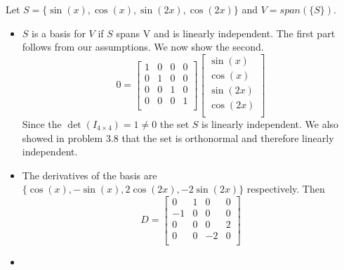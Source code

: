 \documentclass[12pt]{article}
\newenvironment{problem}[2][Problem]{\begin{trivlist}
\item[\hskip \labelsep {\bfseries #1}\hskip \labelsep {\bfseries #2}]}{\end{trivlist}}
\begin{document}
\begin{problem}{8.} Let $S = \{\sin(x), \cos(x), \sin(2x), \cos(2x) \}$ and $V = span(\{S\})$. 
\begin{itemize}
\item [(i)] $S$ is a basis for $V$ if $S$ spans V and is linearly independent. The first part follows from our assumptions. We now show the second. 
\[0 =
  \left[ {\begin{array}{cccc}
   1 & 0 & 0 & 0\\
   0 & 1 & 0 & 0\\
   0 & 0 & 1 & 0\\
   0 & 0 & 0 & 1\\
  \end{array} } \right]\begin{bmatrix}
   \sin(x) \\
   \cos(x) \\
   \sin(2x) \\
   \cos(2x)\\
  \end{bmatrix} 
\]
Since the $\det(I_{4 \times 4}) = 1 \neq 0$ the set $S$ is linearly independent. We also showed in problem 3.8 that the set is orthonormal and therefore linearly independent. 
\item [(ii)] The derivatives of the basis are $\{\cos(x), -\sin(x), 2\cos(2x), -2\sin(2x)\}$ respectively. Then \[D=
  \left[ {\begin{array}{cccc}
   0 & 1 & 0 & 0\\
   -1 & 0 & 0 & 0\\
   0 & 0 & 0 & 2\\
   0 & 0 & -2 & 0\\
  \end{array} } \right]
\]
\item [(iii)]
\end{itemize}
\end{problem}

\begin{problem}{13.} 
\end{problem}

\begin{problem}{15.} 
\end{problem}

\begin{problem}{16.} 
\end{problem}

\begin{problem}{18.} 
\end{problem}
\end{document}

